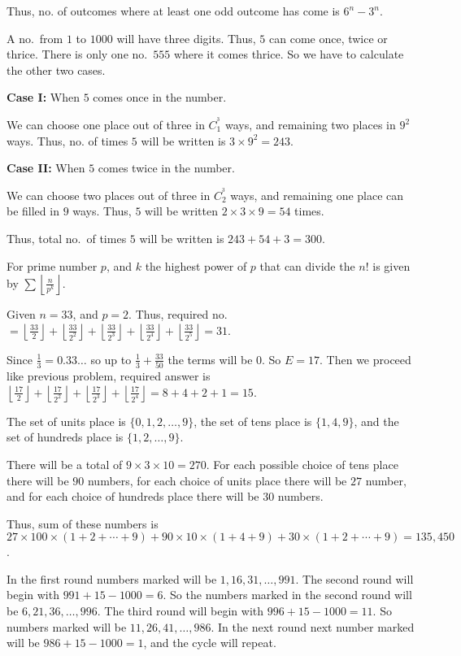   Thus, no. of outcomes where at least one odd outcome has come is $6^n - 3^n$.
\item A no.\ from $1$ to $1000$ will have three digits. Thus, $5$ can come once, twice or thrice. There is
  only one no.\ $555$ where it comes thrice. So we have to calculate the other two cases.

  {\bf Case I:} When $5$ comes once in the number.

  We can choose one place out of three in $C_1^^3$ ways, and remaining two places in $9^2$ ways. Thus,
  no. of times $5$ will be written is $3\times9^2 = 243$.

  {\bf Case II:} When $5$ comes twice in the number.

  We can choose two places out of three in $C_2^^3$ ways, and remaining one place can be filled in $9$
  ways. Thus, $5$ will be written $2\times3\times9 = 54$ times.

  Thus, total no.\ of times $5$ will be written is $243 + 54 + 3 = 300$.
\item For prime number $p$, and $k$ the highest power of $p$ that can divide the $n!$ is given by
  $\displaystyle\sum\left\lfloor \frac{n}{p^k}\right\rfloor$.

  Given $n = 33$, and $p = 2$. Thus, required no.\ $= \left\lfloor \frac{33}{2}\right\rfloor + \left\lfloor
  \frac{33}{2^2}\right\rfloor + \left\lfloor \frac{33}{2^3}\right\rfloor + \left\lfloor
  \frac{33}{2^4}\right\rfloor + \left\lfloor \frac{33}{2^5}\right\rfloor = 31$.
\item Since $\frac{1}{3} = 0.33\ldots$ so up to $\frac{1}{3} + \frac{33}{50}$ the terms will be $0$. So $E =
  17$. Then we proceed like previous problem, required answer is $\left\lfloor \frac{17}{2}\right\rfloor +
  \left\lfloor \frac{17}{2^2}\right\rfloor + \left\lfloor \frac{17}{2^3}\right\rfloor + \left\lfloor
  \frac{17}{2^4}\right\rfloor = 8 + 4 + 2 + 1 = 15$.
\item The set of unit\symbol[rightquote]s place is $\{0, 1, 2, \ldots, 9\}$, the set of
  ten\symbol[rightquote]s place is $\{1, 4, 9\}$, and the set of hundred\symbol[rightquote]s place is $\{1,
  2, \ldots, 9\}$.

  There will be a total of $9\times3\times10 = 270$. For each possible choice of ten\symbol[rightquote]s
  place there will be $90$ numbers, for each choice of unit\symbol[rightquote]s place there will be $27$
  number, and for each choice of hundred\symbol[rightquote]s place there will be $30$ numbers.

  Thus, sum of these numbers is $27\times100\times(1 + 2 + \cdots + 9) + 90\times10\times(1 + 4 + 9) +
  30\times(1 + 2 + \cdots + 9) = 135,450$.
\item In the first round numbers marked will be $1, 16, 31, \ldots, 991$. The second round will begin with
  $991 + 15 - 1000 = 6$. So the numbers marked in the second round will be $6, 21, 36, \ldots, 996$. The
  third round will begin with $996 + 15 - 1000 = 11$. So numbers marked will be $11, 26, 41, \ldots,
  986$. In the next round next number marked will be $986 + 15 - 1000 = 1$, and the cycle will repeat.

